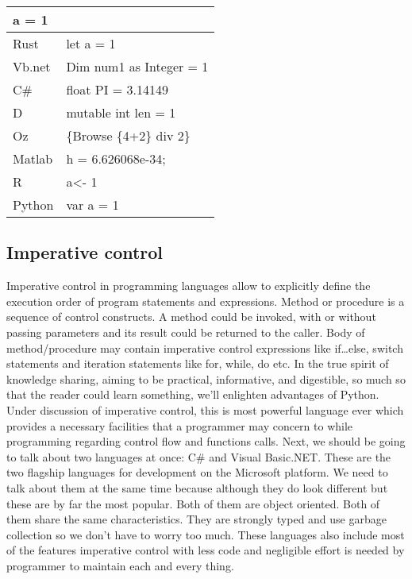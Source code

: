 \documentclass{sig-alternate}
\begin{document}
\begin{table}[]
\begin{tabular}{|l|l|}
 a = 1                                  \\ \hline
Rust   & let a = 1                                  \\ \hline
Vb.net & Dim num1  as Integer = 1                   \\ \hline
C\#    & float PI = 3.14149                         \\ \hline
D      & mutable int len = 1                        \\ \hline
Oz     & \{Browse \{4+2\} div 2\}                   \\ \hline
Matlab & h = 6.626068e-34;                          \\ \hline
R      & a\textless{}- 1                            \\ \hline
Python & var a = 1                                  \\ \hline
\end{tabular}
\end{table}

\subsection{Imperative control}
Imperative control in programming languages allow to explicitly define the execution order of program statements and expressions. Method or procedure is a sequence of control constructs. A method could be invoked, with or without passing parameters and its result could be returned to the caller. Body of method/procedure may contain imperative control expressions like if…else, switch statements and iteration statements like for, while, do etc.
In the true spirit of knowledge sharing, aiming to be practical, informative, and digestible, so much so that the reader could learn something, we’ll enlighten advantages of Python. Under discussion of imperative control, this is most powerful language ever which provides a necessary facilities that a programmer may concern to while programming regarding control flow and functions calls. Next, we should be going to talk about two languages at once: C# and Visual Basic.NET. These are the two flagship languages for development on the Microsoft platform. We need to talk about them at the same time because although they do look different but these are by far the most popular. Both of them are object oriented. Both of them share the same characteristics. They are strongly typed and use garbage collection so we don't have to worry too much. These languages also include most of the features imperative control with less code and negligible effort is needed by programmer to maintain each and every thing. 
\end{document}
